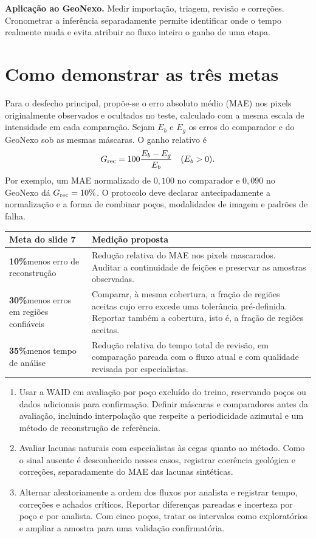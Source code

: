 \documentclass[11pt,a4paper]{article}
\newcommand{\minor}[1]{\par\medskip{\sffamily\bfseries\color{forest}#1}\par}
\newcommand{\metric}[2]{\textbf{#1}\enspace #2}
\begin{document}
\textbf{Aplicação ao GeoNexo.} Medir importação, triagem, revisão e correções. Cronometrar a inferência separadamente permite identificar onde o tempo realmente muda e evita atribuir ao fluxo inteiro o ganho de uma etapa.

\newpage
\section{Como demonstrar as três metas}

Para o desfecho principal, propõe-se o erro absoluto médio (MAE) nos pixels originalmente observados e ocultados no teste, calculado com a mesma escala de intensidade em cada comparação. Sejam $E_b$ e $E_g$ os erros do comparador e do GeoNexo sob as mesmas máscaras. O ganho relativo é
\[
    G_{\rm rec}=100\frac{E_b-E_g}{E_b}\quad (E_b>0).
\]
Por exemplo, um MAE normalizado de $0{,}100$ no comparador e $0{,}090$ no GeoNexo dá $G_{\rm rec}=10\%$. O protocolo deve declarar antecipadamente a normalização e a forma de combinar poços, modalidades de imagem e padrões de falha.

\begin{center}
\small
\begin{tabularx}{\linewidth}{@{}p{.28\linewidth}Y@{}}
\toprule
\textbf{Meta do slide 7} & \textbf{Medição proposta} \\
\midrule
\metric{10\%}{menos erro de reconstrução} &
Redução relativa do MAE nos pixels mascarados. Auditar a continuidade de feições e preservar as amostras observadas. \\
\metric{30\%}{menos erros em regiões confiáveis} &
Comparar, à mesma cobertura, a fração de regiões aceitas cujo erro excede uma tolerância pré-definida. Reportar também a cobertura, isto é, a fração de regiões aceitas. \\
\metric{35\%}{menos tempo de análise} &
Redução relativa do tempo total de revisão, em comparação pareada com o fluxo atual e com qualidade revisada por especialistas. \\
\bottomrule
\end{tabularx}
\end{center}

\minor{Desenho do piloto}
\begin{enumerate}
\setlength{\itemsep}{1pt}
\setlength{\topsep}{2pt}
\item Usar a WAID em avaliação por poço excluído do treino, reservando poços ou dados adicionais para confirmação. Definir máscaras e comparadores antes da avaliação, incluindo interpolação que respeite a periodicidade azimutal e um método de reconstrução de referência.
\item Avaliar lacunas naturais com especialistas às cegas quanto ao método. Como o sinal ausente é desconhecido nesses casos, registrar coerência geológica e correções, separadamente do MAE das lacunas sintéticas.
\item Alternar aleatoriamente a ordem dos fluxos por analista e registrar tempo, correções e achados críticos. Reportar diferenças pareadas e incerteza por poço e por analista. Com cinco poços, tratar os intervalos como exploratórios e ampliar a amostra para uma validação confirmatória.
\end{enumerate}
\end{document}
